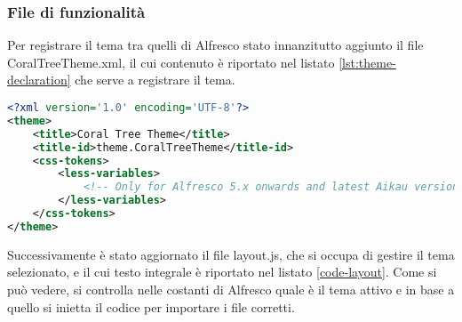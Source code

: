 \subsubsection{File di funzionalità}
Per registrare il tema tra quelli di Alfresco stato innanzitutto aggiunto il file CoralTreeTheme.xml, il cui contenuto è riportato nel listato \ref{lst:theme-declaration} che serve a registrare il tema.
\begin{lstlisting}[language=XML, caption=XML della dichiarazione del tema, label=lst:theme-declaration]
<?xml version='1.0' encoding='UTF-8'?>
<theme>
    <title>Coral Tree Theme</title>
    <title-id>theme.CoralTreeTheme</title-id>
    <css-tokens>
        <less-variables>
            <!-- Only for Alfresco 5.x onwards and latest Aikau version -->
        </less-variables>
    </css-tokens>
</theme>
\end{lstlisting}
Successivamente è stato aggiornato il file layout.js, che si occupa di gestire il tema selezionato, e il cui testo integrale è riportato nel listato \ref{code-layout}. Come si può vedere, si controlla nelle costanti di Alfresco quale è il tema attivo e in base a quello si inietta il codice per importare i file corretti.
